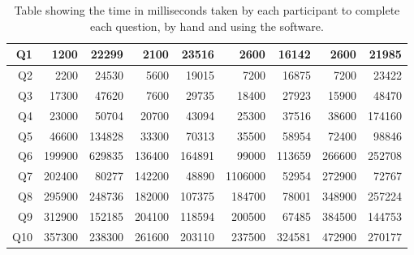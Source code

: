 \documentclass[12pt,twoside,notitlepage,xetex]{report}
\begin{document}
\begin{center}
\begin{table}[H]
\begin{center}
\begin{tabular}{|r||r|r||r|r||r|r||r|r|}
Q1 & 1200 & 22299 & 2100 & 23516 & 2600 & 16142 & 2600 & 21985\\ \hline
Q2 & 2200 & 24530 & 5600 & 19015 & 7200 & 16875 & 7200 & 23422\\ \hline
Q3 & 17300 & 47620 & 7600 & 29735 & 18400 & 27923 & 15900 & 48470\\ \hline
Q4 & 23000 & 50704 & 20700 & 43094 & 25300 & 37516 & 38600 & 174160\\ \hline
Q5 & 46600 & 134828 & 33300 & 70313 & 35500 & 58954 & 72400 & 98846\\ \hline
Q6 & 199900 & 629835 & 136400 & 164891 & 99000 & 113659 & 266600 & 252708\\ \hline
Q7 & 202400 & 80277 & 142200 & 48890 & 1106000 & 52954 & 272900 & 72767\\ \hline
Q8 & 295900 & 248736 & 182000 & 107375 & 184700 & 78001 & 348900 & 257224\\ \hline
Q9 & 312900 & 152185 & 204100 & 118594 & 200500 & 67485 & 384500 & 144753\\ \hline
Q10 & 357300 & 238300 & 261600 & 203110 & 237500 & 324581 & 472900 & 270177\\
\hline
\end{tabular}
\end{center}
\caption{Table showing the time in milliseconds taken by each participant to complete each question, by hand and using the software.}
\label{tab:BigTimes}
\end{table}
\end{center}
\end{document}
